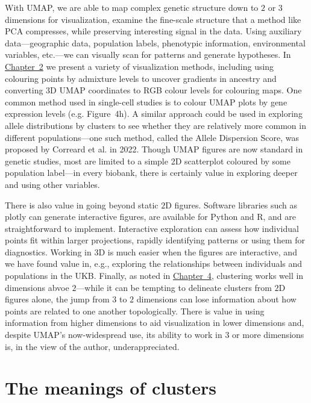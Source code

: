 With UMAP, we are able to map complex genetic structure down to $2$ or $3$ dimensions for visualization, examine the fine-scale structure that a method like PCA compresses, while preserving interesting signal in the data. Using auxiliary data---geographic data, population labels, phenotypic information, environmental variables, etc.---we can visually scan for patterns and generate hypotheses. In \hyperref[chap:chapter2]{Chapter~2} we present a variety of visualization methods, including using colouring points by admixture levels to uncover gradients in ancestry and converting 3D UMAP coordinates to RGB colour levels for colouring maps. One common method used in single-cell studies is to colour UMAP plots by gene expression levels (e.g. \citep{jessa_stalled_2019} Figure~4h). A similar approach could be used in exploring allele distributions by clusters to see whether they are relatively more common in different populations---one such method, called the Allele Dispersion Score, was proposed by Correard et al. in 2022\citep{correard_allele_2022}. Though UMAP figures are now standard in genetic studies, most are limited to a simple 2D scatterplot coloured by some population label---in every biobank, there is certainly value in exploring deeper and using other variables.

There is also value in going beyond static $2$D figures. Software libraries such as plotly\citep{plotly} can generate interactive figures, are available for Python and R, and are straightforward to implement. Interactive exploration can assess how individual points fit within larger projections, rapidly identifying patterns or using them for diagnostics. Working in $3$D is much easier when the figures are interactive, and we have found value in, e.g., exploring the relationships between individuals and populations in the UKB. Finally, as noted in \hyperref[chap:chapter4]{Chapter~4}, clustering works well in dimensions abvoe $2$---while it can be tempting to delineate clusters from $2$D figures alone, the jump from $3$ to $2$ dimensions can lose information about how points are related to one another topologically. There is value in using information from higher dimensions to aid visualization in lower dimensions and, despite UMAP's now-widespread use, its ability to work in $3$ or more dimensions is, in the view of the author, underappreciated.

\clearpage

\section{The meanings of clusters}

